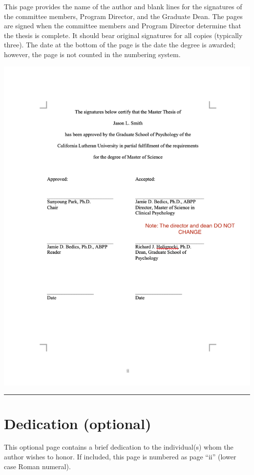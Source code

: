 \documentclass[openany]{book}
\begin{document}
This page provides the name of the author and blank lines for the signatures of the committee members, Program Director, and the Graduate Dean. The pages are signed when the committee members and Program Director determine that the thesis is complete. It should bear original signatures for all copies (typically three). The date at the bottom of the page is the date the degree is awarded; however, the page is not counted in the numbering system.

\includegraphics{images/signaturepage.png}

\begin{center}\rule{0.5\linewidth}{0.5pt}\end{center}

\hypertarget{dedication-optional}{%
\section{Dedication (optional)}\label{dedication-optional}}

This optional page contains a brief dedication to the individual(s) whom the author wishes to honor. If included, this page is numbered as page ``ii'' (lower case Roman numeral).
\end{document}

